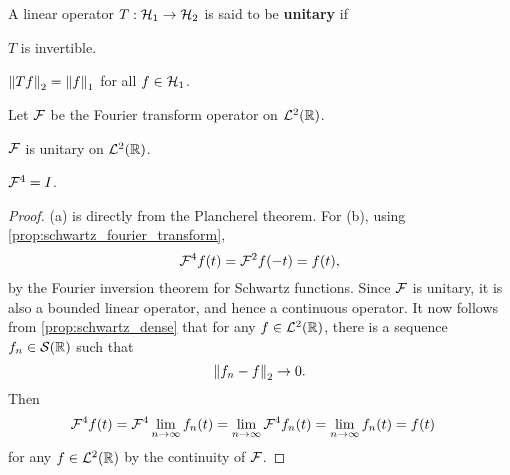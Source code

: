 \begin{definition}
    A linear operator $T:\mathcal{H}_1\to\mathcal{H}_2$ is said to be \textbf{unitary} if 
    \begin{thmenum}
        \item $T$ is invertible. 
        \item $\left\lVert {Tf} \right\rVert_2 = \left\lVert {f} \right\rVert_1$ for all $f\in\mathcal{H}_1$.
    \end{thmenum}
\end{definition}

\begin{proposition}
    Let $\mathcal{F}$ be the Fourier transform operator on $\mathcal{L}^2(\mathbb{R})$. 
    \begin{thmenum}
        \item $\mathcal{F}$ is unitary on $\mathcal{L}^2(\mathbb{R})$. 
        \item $\mathcal{F}^4 = I$.
    \end{thmenum}
\end{proposition}
\begin{proof}
    (a) is directly from the Plancherel theorem. For (b), using 
    \cref{prop:schwartz_fourier_transform},
    \begin{equation*}
        \mathcal{F}^4 f(t) = \mathcal{F}^2 f(-t) = f(t),
    \end{equation*}
    by the Fourier inversion theorem for Schwartz functions. Since $\mathcal{F}$ is 
    unitary, it is also a bounded linear operator, and hence a continuous 
    operator. It now follows from \cref{prop:schwartz_dense} that for any 
    $f\in\mathcal{L}^2(\mathbb{R})$, there is a sequence $f_n\in\mathcal{S}(\mathbb{R})$ such that 
    \begin{equation*}
        \left\lVert {f_n - f} \right\rVert_2\to 0.
    \end{equation*}
    Then
    \begin{equation*}
        \begin{split}
            \mathcal{F}^4 f(t) &= \mathcal{F}^4 \lim_{n\to\infty}f_n(t) = \lim_{n\to\infty}\mathcal{F}^4f_n(t)
            = \lim_{n\to\infty}f_n(t) = f(t) 
        \end{split}
    \end{equation*}
    for any $f\in\mathcal{L}^2(\mathbb{R})$ by the continuity of $\mathcal{F}$.
\end{proof}

